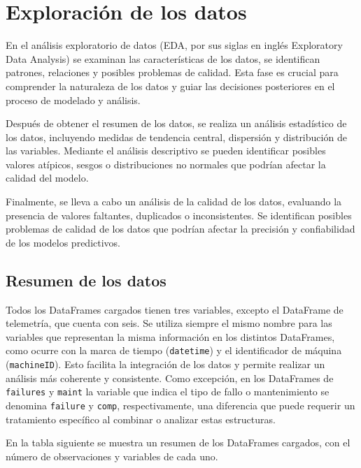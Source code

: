 \documentclass[IB]{TFUOC}
\begin{document}
\section{Exploración de los datos}

En el análisis exploratorio de datos (EDA, por sus siglas en inglés Exploratory Data Analysis) se examinan las
características de los datos, se identifican patrones, relaciones y posibles problemas de calidad. Esta fase es crucial
para comprender la naturaleza de los datos y guiar las decisiones posteriores en el proceso de modelado y análisis.

Después de obtener el resumen de los datos, se realiza un análisis estadístico de los datos, incluyendo medidas de
tendencia central, dispersión y distribución de las variables. Mediante el análisis descriptivo se pueden identificar
posibles valores atípicos, sesgos o distribuciones no normales que podrían afectar la calidad del modelo.

Finalmente, se lleva a cabo un análisis de la calidad de los datos, evaluando la presencia de valores faltantes,
duplicados o inconsistentes. Se identifican posibles problemas de calidad de los datos que podrían afectar la precisión
y confiabilidad de los modelos predictivos.

\subsection{Resumen de los datos}

Todos los DataFrames cargados tienen tres variables, excepto el DataFrame de telemetría, que cuenta con seis. Se
utiliza siempre el mismo nombre para las variables que representan la misma información en los distintos DataFrames,
como ocurre con la marca de tiempo (\texttt{datetime}) y el identificador de máquina (\texttt{machineID}). Esto facilita
la integración de los datos y permite realizar un análisis más coherente y consistente. Como excepción, en los
DataFrames de \texttt{failures} y \texttt{maint} la variable que indica el tipo de fallo o mantenimiento se denomina
\texttt{failure} y \texttt{comp}, respectivamente, una diferencia que puede requerir un tratamiento específico al
combinar o analizar estas estructuras.

En la tabla siguiente se muestra un resumen de los DataFrames cargados, con el número de observaciones y variables de
cada uno.
\end{document}
